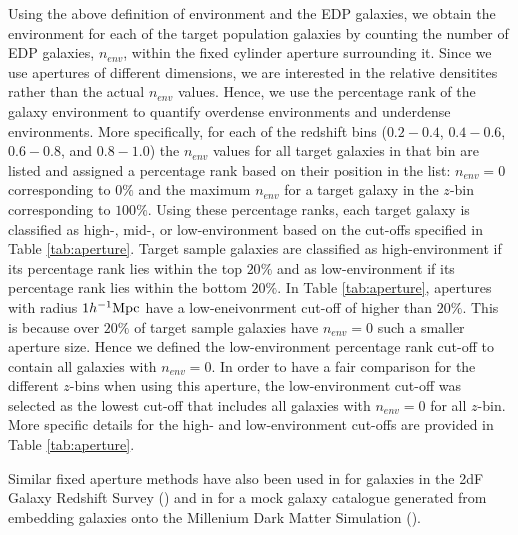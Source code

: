 \documentclass{emulateapj}
\begin{document}
Using the above definition of environment and the EDP galaxies, we obtain the environment for each of the target population galaxies by counting the number of EDP galaxies, 
$n_{env}$, within the fixed cylinder aperture surrounding it. 
Since we use apertures of different dimensions, we are interested in the relative densitites rather than the actual $n_{env}$ values.
Hence, we use the percentage rank of the galaxy environment to quantify overdense environments and underdense environments.
More specifically, for each of the redshift bins ($0.2-0.4$, $0.4-0.6$, $0.6-0.8$, and $0.8-1.0$) the $n_{env}$ values for all target galaxies in that bin are listed and assigned a percentage rank based on their position in the list: $n_{env} = 0$ corresponding to $0\%$ and the maximum $n_{env}$ for a target galaxy in the $z$-bin corresponding to $100\%$. 
Using these percentage ranks, each target galaxy is classified as high-, mid-, or low-environment based on the cut-offs specified in Table \ref{tab:aperture}. 
Target sample galaxies are classified as high-environment if its percentage rank lies within the top $20\%$ and as low-environment if its percentage rank lies within the bottom $20\%$. 
In Table \ref{tab:aperture}, apertures with radius $1 h^{-1} \rm{Mpc}$ have a low-eneivonrment cut-off of higher than $20\%$.
This is because over $20\%$ of target sample galaxies have $n_{env}=0$ such a smaller aperture size.
Hence we defined the low-environment percentage rank cut-off to contain all galaxies with $n_{env}=0$. 
In order to have a fair comparison for the different $z$-bins when using this aperture, the low-environment cut-off was selected as the lowest cut-off that includes all galaxies with $n_{env}=0$ for all $z$-bin.
More specific details for the high- and low-environment cut-offs are provided in Table \ref{tab:aperture}.

Similar fixed aperture methods have also been used in \cite{Croton:2005aa} for galaxies in the 2dF Galaxy Redshift Survey (\cite{Colless:2003aa}) and in \cite{Muldrew:2012aa} 
for a mock galaxy catalogue generated from embedding galaxies onto the Millenium Dark Matter Simulation (\cite{Springel:2005aa}). 
\end{document}
